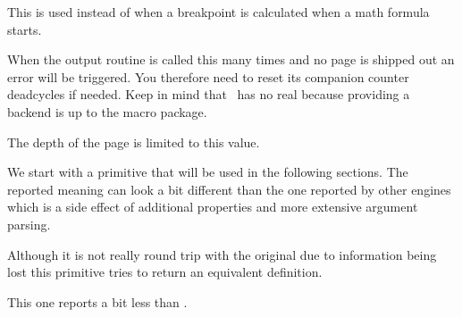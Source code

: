 \stopnewprimitive

\startnewprimitive[title={\prm {mathtolerance}}]

This is used instead of  when a breakpoint is calculated when a
math formula starts.

\stopnewprimitive

\startoldprimitive[title={\prm {maxdeadcycles}}]

When the output routine is called this many times and no page is shipped out an
error will be triggered. You therefore need to reset its companion counter \prm
{deadcycles} if needed. Keep in mind that \LUAMETATEX\ has no real 
because providing a backend is up to the macro package.

\stopoldprimitive

\startoldprimitive[title={\prm {maxdepth}}]

The depth of the page is limited to this value.

\stopoldprimitive

\startoldprimitive[title={\prm {meaning}}]

We start with a primitive that will be used in the following sections. The
reported meaning can look a bit different than the one reported by other engines
which is a side effect of additional properties and more extensive argument
parsing.

\startbuffer
\tolerant\permanent\protected\gdef\foo[#1]#*[#2]{(#1)(#2)} \meaning\foo
\stopbuffer

\typebuffer \getbuffer \glet\foo\relax

\stopoldprimitive

\startnewprimitive[title={\prm {meaningasis}}]

Although it is not really round trip with the original due to information
being lost this primitive tries to return an equivalent definition.

\startbuffer
\tolerant\permanent\protected\gdef\foo[#1]#*[#2]{(#1)(#2)} \meaningasis\foo
\stopbuffer

\typebuffer \getbuffer \glet\foo\relax

\stopnewprimitive

\startnewprimitive[title={\prm {meaningful}}]

This one reports a bit less than .

\startbuffer
\tolerant\permanent\protected\gdef\foo[#1]#*[#2]{(#1)(#2)} \meaningful\foo
\stopbuffer

\typebuffer \getbuffer \let\gfoo\relax

